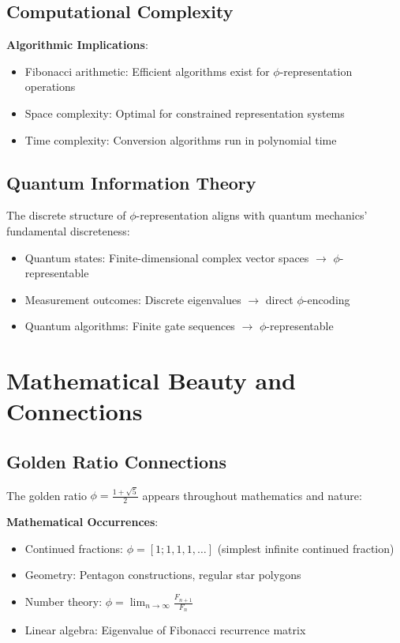 \documentclass[12pt,letterpaper]{article}
\begin{document}
\subsection{Computational Complexity}

\textbf{Algorithmic Implications}:
\begin{itemize}
\item Fibonacci arithmetic: Efficient algorithms exist for $\phi$-representation operations
\item Space complexity: Optimal for constrained representation systems
\item Time complexity: Conversion algorithms run in polynomial time
\end{itemize}

\subsection{Quantum Information Theory}

The discrete structure of $\phi$-representation aligns with quantum mechanics' fundamental discreteness:
\begin{itemize}
\item Quantum states: Finite-dimensional complex vector spaces $\to$ $\phi$-representable
\item Measurement outcomes: Discrete eigenvalues $\to$ direct $\phi$-encoding
\item Quantum algorithms: Finite gate sequences $\to$ $\phi$-representable
\end{itemize}

\section{Mathematical Beauty and Connections}

\subsection{Golden Ratio Connections}

The golden ratio $\phi = \frac{1+\sqrt{5}}{2}$ appears throughout mathematics and nature:

\textbf{Mathematical Occurrences}:
\begin{itemize}
\item Continued fractions: $\phi = [1;1,1,1,\ldots]$ (simplest infinite continued fraction)
\item Geometry: Pentagon constructions, regular star polygons
\item Number theory: $\phi = \lim_{n\to\infty} \frac{F_{n+1}}{F_n}$
\item Linear algebra: Eigenvalue of Fibonacci recurrence matrix
\end{itemize}
\end{document}
